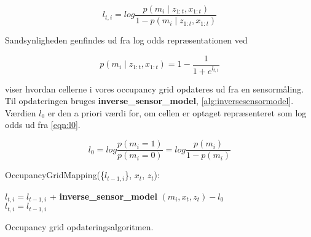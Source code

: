 \begin{equation}
l_{t,i} = log{ \frac{p(m_i \mid z_{1:t}, x_{1:t})}{1 - p(m_i \mid z_{1:t}, x_{1:t})}} 
\end{equation} 

Sandsynligheden genfindes ud fra log odds repræsentationen ved

\begin{equation}
	p(m_i \mid z_{1:t}, x_{1:t}) = 1 - \frac{1}{1 + e^{l_{t,i}}}
\end{equation} 

 viser hvordan cellerne i vores occupancy grid opdateres ud fra en sensormåling. 
Til opdateringen bruges \textbf{inverse\_sensor\_model}, \cref{alg:inversesensormodel}.
Værdien $ l_0 $ er den a priori værdi for, om cellen er optaget repræsenteret som log odds ud fra \cref{eqn:l0}.

\begin{equation}
  l_0 =  log \frac{p(m_i = 1)}{p(m_i = 0)} = log \frac{p(m_i)}{1- p(m_i)}
\end{equation} 

\begin{algorithm}[H]
\LinesNumbered
OccupancyGridMapping(\{$l_{t-1,i}$\}, $x_t$, $z_t$):

{
{ $ l_{t,i} = l_{t-1,i} $ + \textbf{inverse\_sensor\_model} $( m_i, x_t, z_t ) - l_0$\\ }
{ $ l_{t,i} = l_{t-1,i}  $\\ }
}
\caption{Occupancy grid opdateringsalgoritmen.}
\label{occupancygrid:alg}
\end{algorithm}





